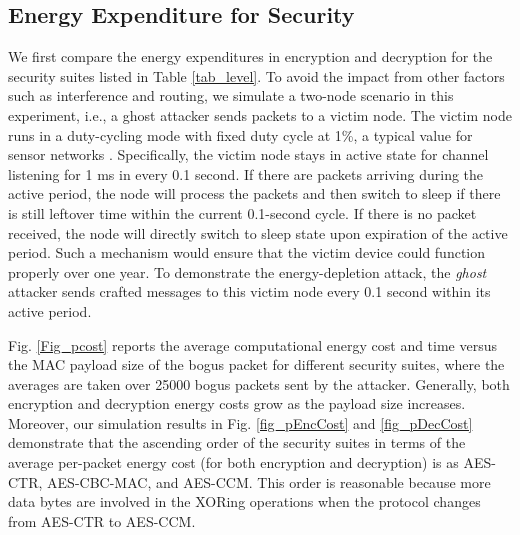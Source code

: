 \documentclass[10pt,journal,cspaper,compsoc]{IEEEtran}
\begin{document}
\begin{figure*}[htbp]
	\centering
	\hspace{-3mm}
	\hspace{-3mm}
	\hspace{-3mm}
\vspace{-2mm}
	\caption{Energy and time costs. (a) and (b): average energy consumption for encrypting a packet and decrypting a secured packet, respectively. (c): average time (ms) for decrypting and verifying a secured packet. (d): percentage of CPU computational cost in receiving (including decrypting) a secured packet.}	
	\label{Fig_pcost}
\end{figure*}

\subsection{Energy Expenditure for Security}\label{sec:sim:energyperpacket}
We first compare the energy expenditures in encryption and decryption for the security suites listed in Table \ref{tab_level}. To avoid the impact from other factors such as interference and routing, we simulate a two-node scenario in this experiment, i.e., a ghost attacker sends packets to a victim node.  The victim node runs in a duty-cycling mode with fixed duty cycle at 1\%, a typical value for sensor networks \cite{liu2009cmac}. Specifically, the victim node stays in active state for channel listening for 1 ms in every 0.1 second. If there are packets arriving during the active period, the node will process the packets and then switch to sleep if there is still leftover time within the current 0.1-second cycle. If there is no packet received, the node will directly switch to sleep state upon expiration of the active period. Such a mechanism would ensure that the victim device could function properly over one year. To demonstrate the energy-depletion attack, the {\em ghost} attacker sends crafted messages to this victim node every 0.1 second within its active period.

Fig. \ref{Fig_pcost} reports the average computational energy cost and time versus the MAC payload size of the bogus packet for different security suites, where the averages are taken over 25000 bogus packets sent by the attacker. Generally, both encryption and decryption energy costs grow as the payload size increases. Moreover, our simulation results in Fig. \ref{fig_pEncCost} and \ref{fig_pDecCost} demonstrate that the ascending order of the security suites in terms of the average per-packet energy cost (for both encryption and decryption) is as AES-CTR, AES-CBC-MAC, and AES-CCM. This order is reasonable because more data bytes are involved in the XORing operations when the protocol changes from AES-CTR to AES-CCM.
\end{document}
